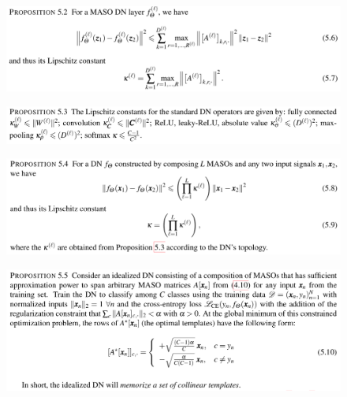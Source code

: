 \documentclass{article}
\begin{document}
\begin{figure}[h]
	\begin{center}
		\includegraphics[width=.8\linewidth]{Figure/prop5p2}
		\label{fig:prop5p2}
	\end{center}
\end{figure}

\begin{figure}[h]
	\begin{center}
		\includegraphics[width=.8\linewidth]{Figure/prop5p3}
		\label{fig:prop5p3}
	\end{center}
\end{figure}


\begin{figure}[h]
	\begin{center}
		\includegraphics[width=.8\linewidth]{Figure/prop5p4}
		\label{fig:prop5p4}
	\end{center}
\end{figure}


\begin{figure}[h]
	\begin{center}
		\includegraphics[width=.8\linewidth]{Figure/prop5p5}
		\label{fig:prop5p5}
	\end{center}
\end{figure}
\end{document}
